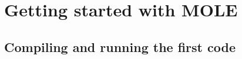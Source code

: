 


\maketitle

\tableofcontents





\section{Getting started with MOLE}
\subsection{Compiling and running the first code}
